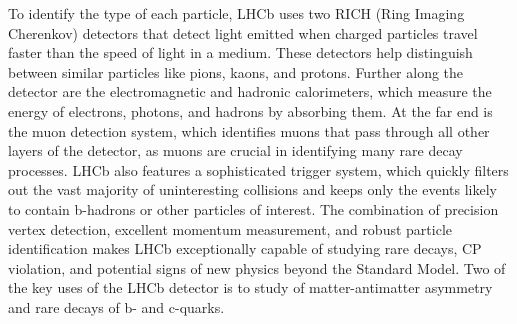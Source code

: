 To identify the type of each particle, LHCb uses two RICH (Ring Imaging Cherenkov) detectors that detect light emitted when charged particles travel faster than the speed of light in a medium. These detectors help distinguish between similar particles like pions, kaons, and protons. Further along the detector are the electromagnetic and hadronic calorimeters, which measure the energy of electrons, photons, and hadrons by absorbing them. At the far end is the muon detection system, which identifies muons that pass through all other layers of the detector, as muons are crucial in identifying many rare decay processes. LHCb also features a sophisticated trigger system, which quickly filters out the vast majority of uninteresting collisions and keeps only the events likely to contain b-hadrons or other particles of interest. The combination of precision vertex detection, excellent momentum measurement, and robust particle identification makes LHCb exceptionally capable of studying rare decays, CP violation, and potential signs of new physics beyond the Standard Model. Two of the key uses of the LHCb detector is to study of matter-antimatter asymmetry and rare decays of b- and c-quarks.\\
